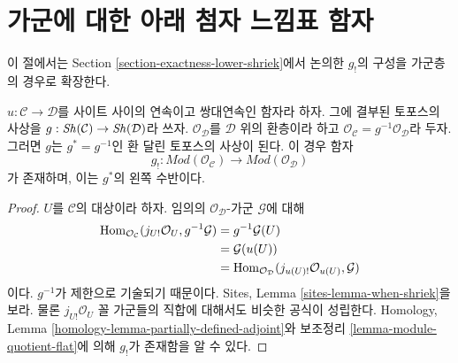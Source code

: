 \section{가군에 대한 아래 첨자 느낌표 함자}
\label{section-lower-shriek-modules}

\noindent
이 절에서는 Section \ref{section-exactness-lower-shriek}에서 논의한
$g_!$의 구성을 가군층의 경우로 확장한다.

\begin{lemma}
\label{lemma-lower-shriek-modules}
$u : \mathcal{C} \to \mathcal{D}$를 사이트 사이의 연속이고 쌍대연속인
함자라 하자. 그에 결부된 토포스의 사상을
$g : \mathop{\mathit{Sh}}\nolimits(\mathcal{C}) \to \mathop{\mathit{Sh}}\nolimits(\mathcal{D})$라 쓰자.
$\mathcal{O}_\mathcal{D}$를 $\mathcal{D}$ 위의 환층이라 하고
$\mathcal{O}_\mathcal{C} = g^{-1}\mathcal{O}_\mathcal{D}$라 두자.
그러면 $g$는 $g^* = g^{-1}$인 환 달린 토포스의 사상이 된다.
이 경우 함자
$$
g_! :
\textit{Mod}(\mathcal{O}_\mathcal{C})
\longrightarrow
\textit{Mod}(\mathcal{O}_\mathcal{D})
$$
가 존재하며, 이는 $g^*$의 왼쪽 수반이다.
\end{lemma}

\begin{proof}
$U$를 $\mathcal{C}$의 대상이라 하자. 임의의
$\mathcal{O}_\mathcal{D}$-가군 $\mathcal{G}$에 대해
\begin{align*}
\mathop{\mathrm{Hom}}\nolimits_{\mathcal{O}_\mathcal{C}}(j_{U!}\mathcal{O}_U, g^{-1}\mathcal{G})
& =
g^{-1}\mathcal{G}(U) \\
& =
\mathcal{G}(u(U)) \\
& =
\mathop{\mathrm{Hom}}\nolimits_{\mathcal{O}_\mathcal{D}}(j_{u(U)!}\mathcal{O}_{u(U)}, \mathcal{G})
\end{align*}
이다. $g^{-1}$가 제한으로 기술되기 때문이다. Sites, Lemma
\ref{sites-lemma-when-shriek}을 보라. 물론 $j_{U!}\mathcal{O}_U$ 꼴
가군들의 직합에 대해서도 비슷한 공식이 성립한다. Homology, Lemma
\ref{homology-lemma-partially-defined-adjoint}와 보조정리
\ref{lemma-module-quotient-flat}에 의해 $g_!$가 존재함을 알 수 있다.
\end{proof}

